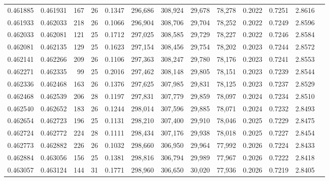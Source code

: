 \begin{tabular}{rrrrrrrrrrrrr}
0.461885 & 0.461931 & 167 &  26 &                                     0.1347 & 296,686 & 308,924 &  29,678 &  78,278 & 0.2022 & 0.7251 & 2.8616 \\
0.461933 & 0.462033 & 218 &  26 &                                     0.1066 & 296,904 & 308,706 &  29,704 &  78,252 & 0.2022 & 0.7249 & 2.8596 \\
0.462033 & 0.462081 & 121 &  25 &                                     0.1712 & 297,025 & 308,585 &  29,729 &  78,227 & 0.2022 & 0.7246 & 2.8584 \\
0.462081 & 0.462135 & 129 &  25 &                                     0.1623 & 297,154 & 308,456 &  29,754 &  78,202 & 0.2023 & 0.7244 & 2.8572 \\
0.462141 & 0.462266 & 209 &  26 &                                     0.1106 & 297,363 & 308,247 &  29,780 &  78,176 & 0.2023 & 0.7241 & 2.8553 \\
0.462271 & 0.462335 &  99 &  25 &                                     0.2016 & 297,462 & 308,148 &  29,805 &  78,151 & 0.2023 & 0.7239 & 2.8544 \\
0.462336 & 0.462468 & 163 &  26 &                                     0.1376 & 297,625 & 307,985 &  29,831 &  78,125 & 0.2023 & 0.7237 & 2.8529 \\
0.462468 & 0.462539 & 206 &  28 &                                     0.1197 & 297,831 & 307,779 &  29,859 &  78,097 & 0.2024 & 0.7234 & 2.8510 \\
0.462540 & 0.462652 & 183 &  26 &                                     0.1244 & 298,014 & 307,596 &  29,885 &  78,071 & 0.2024 & 0.7232 & 2.8493 \\
0.462654 & 0.462723 & 196 &  25 &                                     0.1131 & 298,210 & 307,400 &  29,910 &  78,046 & 0.2025 & 0.7229 & 2.8475 \\
0.462724 & 0.462772 & 224 &  28 &                                     0.1111 & 298,434 & 307,176 &  29,938 &  78,018 & 0.2025 & 0.7227 & 2.8454 \\
0.462773 & 0.462882 & 226 &  26 &                                     0.1032 & 298,660 & 306,950 &  29,964 &  77,992 & 0.2026 & 0.7224 & 2.8433 \\
0.462884 & 0.463056 & 156 &  25 &                                     0.1381 & 298,816 & 306,794 &  29,989 &  77,967 & 0.2026 & 0.7222 & 2.8418 \\
0.463057 & 0.463124 & 144 &  31 &                                     0.1771 & 298,960 & 306,650 &  30,020 &  77,936 & 0.2026 & 0.7219 & 2.8405 \\

\end{tabular}
